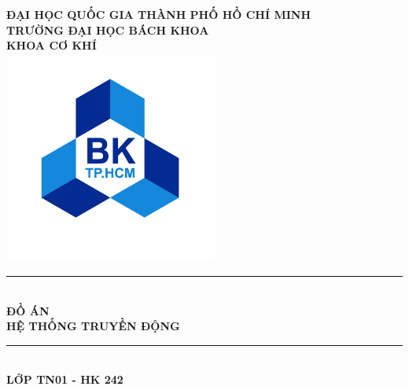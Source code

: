 \begin{titlepage}   
    \begin{center}
        \vspace*{-2cm} 
        \large
        \textbf{ĐẠI HỌC QUỐC GIA THÀNH PHỐ HỒ CHÍ MINH \\
        TRƯỜNG ĐẠI HỌC BÁCH KHOA\\
        KHOA CƠ KHÍ\\}
        \vspace{0.5cm}
        \includegraphics[width=70mm, height=70mm]{pictures/hcmut.png} \\
        \rule{\linewidth}{0.5mm}\\
        \vspace{1cm}
        \LARGE
        \textbf{ĐỒ ÁN}\\                                                                                                                                                                                                                    
        \vspace*{0.5cm}
        \Huge
        \textbf{HỆ THỐNG TRUYỀN ĐỘNG}\\                                                                                                                                                                                                                                                                                                                                                                                                                                             
        \vspace{0.5cm}
        \rule{\linewidth}{0.5mm}\\
        \vspace{0.6cm}
        \LARGE
        \textbf{LỚP TN01 - HK 242} \\
        \vspace{0.8cm}

\end{center}
\end{titlepage}
